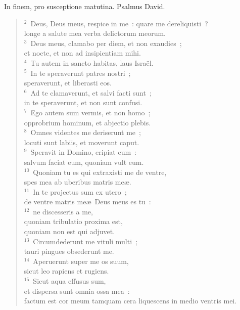 \bchapter
\lettrine[lines=3,image=true,loversize=0.05,lraise=-0.03]{I}{}n finem, pro susceptione matutina. Psalmus David.
\begin{flushleft}\begin{verse}\vspace{6pt}${}^{2}$~Deus, Deus meus, respice in me~: quare me dereliquisti~?\\ longe a salute mea verba delictorum meorum.\\
${}^{3}$~Deus meus, clamabo per diem, et non exaudies~;\\ et nocte, et non ad insipientiam mihi.\\
${}^{4}$~Tu autem in sancto habitas, laus Isra\"el.\\
${}^{5}$~In te speraverunt patres nostri~;\\ speraverunt, et liberasti eos.\\
${}^{6}$~Ad te clamaverunt, et salvi facti sunt~;\\ in te speraverunt, et non sunt confusi.\\
${}^{7}$~Ego autem sum vermis, et non homo~;\\ opprobrium hominum, et abjectio plebis.\\
${}^{8}$~Omnes videntes me deriserunt me~;\\ locuti sunt labiis, et moverunt caput.\\
${}^{9}$~Speravit in Domino, eripiat eum~:\\ salvum faciat eum, quoniam vult eum.\\
${}^{10}$~Quoniam tu es qui extraxisti me de ventre,\\ spes mea ab uberibus matris me\ae .\\
${}^{11}$~In te projectus sum ex utero~;\\ de ventre matris me\ae\ Deus meus es tu~:\\
${}^{12}$~ne discesseris a me,\\ quoniam tribulatio proxima est,\\ quoniam non est qui adjuvet.\\
${}^{13}$~Circumdederunt me vituli multi~;\\ tauri pingues obsederunt me.\\
${}^{14}$~Aperuerunt super me os suum,\\ sicut leo rapiens et rugiens.\\
${}^{15}$~Sicut aqua effusus sum,\\ et dispersa sunt omnia ossa mea~:\\ factum est cor meum tamquam cera liquescens in medio ventris mei.\\

\end{verse}
\end{flushleft}
